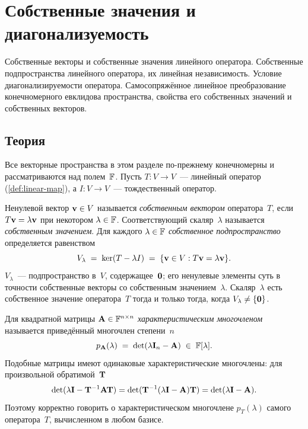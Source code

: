 
\section{Собственные значения и диагонализуемость}
\label{sec:1.1.06-eigenvalues}

\begin{ticket}
Собственные векторы и собственные значения линейного оператора. Собственные подпространства линейного оператора, их линейная независимость. Условие диагонализируемости оператора. Самосопряжённое линейное преобразование конечномерного евклидова пространства, свойства его собственных значений и собственных векторов.
\end{ticket}

\subsection*{Теория}

Все векторные пространства в этом разделе по-прежнему конечномерны и
рассматриваются над полем~$\mathbb{F}$. Пусть $T \colon V \to V$~--- линейный
оператор (\cref{def:linear-map}), а $I \colon V \to V$~--- тождественный
оператор.

\begin{definition}
\label{def:eigenvector-value-space}
Ненулевой вектор $\mathbf{v} \in V$ называется \emph{собственным
вектором} оператора~$T$, если $T\mathbf{v} = \lambda \mathbf{v}$ при
некотором $\lambda \in \mathbb{F}$. Соответствующий скаляр~$\lambda$ называется
\emph{собственным значением}. Для каждого $\lambda \in \mathbb{F}$
\emph{собственное подпространство} определяется равенством
\[
  V_\lambda \;=\; \ker(T - \lambda I) \;=\; \{\mathbf{v} \in V : T\mathbf{v} = \lambda\mathbf{v}\}.
\]
$V_\lambda$~--- подпространство в~$V$, содержащее~$\mathbf{0}$; его
ненулевые элементы суть в точности собственные векторы со собственным
значением~$\lambda$. Скаляр~$\lambda$ есть собственное значение
оператора~$T$ тогда и только тогда, когда $V_\lambda \neq \{\mathbf{0}\}$.
\end{definition}

\begin{definition}
\label{def:char-poly}
Для квадратной матрицы $\mathbf{A} \in \mathbb{F}^{n \times n}$
\emph{характеристическим многочленом} называется приведённый
многочлен степени~$n$
\[
  p_{\mathbf{A}}(\lambda) \;=\; \det(\lambda \mathbf{I}_n - \mathbf{A}) \;\in\; \mathbb{F}[\lambda].
\] Подобные матрицы имеют одинаковые
характеристические многочлены: для произвольной обратимой~$\mathbf{T}$
\[
  \det(\lambda \mathbf{I} - \mathbf{T}^{-1}\mathbf{A}\mathbf{T})
  = \det(\mathbf{T}^{-1}(\lambda \mathbf{I} - \mathbf{A})\mathbf{T})
  = \det(\lambda \mathbf{I} - \mathbf{A}).
\]
Поэтому корректно говорить о характеристическом многочлене $p_T(\lambda)$
самого оператора~$T$, вычисленном в любом базисе.
\end{definition}

